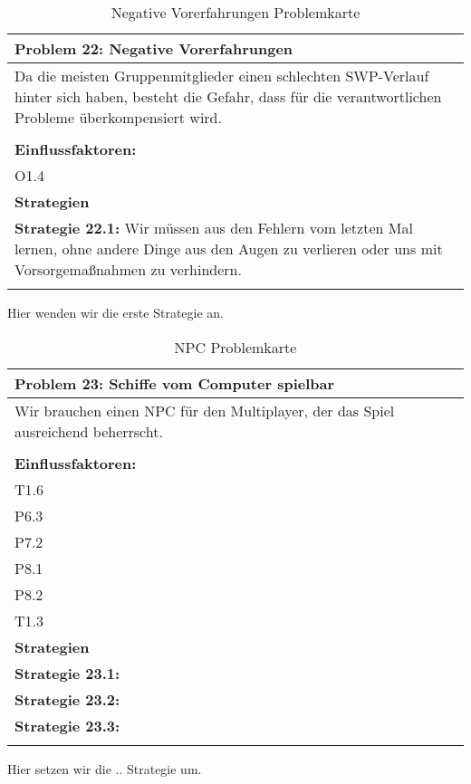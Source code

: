 \documentclass[fontsize=12pt,paper=a4,twoside]{scrartcl}
\begin{document}
\begin{table}[H]
    \centering
    \begin{tabular}{|p{15cm}|}
    \hline
          \textbf{Problem 22: Negative Vorerfahrungen}  \\ \hline
	Da die meisten Gruppenmitglieder einen schlechten SWP-Verlauf hinter sich haben, besteht die Gefahr, dass für die verantwortlichen Probleme überkompensiert wird. \\
         \\ \hline
          \textbf{Einflussfaktoren: } \\
	O1.4 \\
          \hline
          \textbf{Strategien} \\ \hline
            {}          
           \label{strategie:22.1}     
          \textbf{Strategie 22.1: } Wir müssen aus den Fehlern vom letzten Mal lernen, ohne andere Dinge aus den Augen zu verlieren oder uns mit Vorsorgemaßnahmen zu verhindern.  \\     
	 \\ \hline
    \end{tabular}

    \caption{Negative Vorerfahrungen Problemkarte}
    \label{tab:ProblemKarte22}
\end{table}
Hier wenden wir die erste Strategie an. \\

\begin{table}[H]
    \centering
    \begin{tabular}{|p{15cm}|}
    \hline
          \textbf{Problem 23: Schiffe vom Computer spielbar}  \\ \hline
	Wir brauchen einen NPC für den Multiplayer, der das Spiel ausreichend beherrscht. \\
         \\ \hline
          \textbf{Einflussfaktoren: } \\
	T1.6 \\
	P6.3 \\
	P7.2 \\
	P8.1 \\
	P8.2 \\
	T1.3 \\
          \hline
          \textbf{Strategien} \\ \hline
            {}          
           \label{strategie:23.1}     
          \textbf{Strategie 23.1:}  \\        
  {}          
           \label{strategie:23.2}              
          \textbf{Strategie 23.2:}  \\
	 {}          
           \label{strategie:23.3}     
          \textbf{Strategie 23.3: }  \\ 
	 \\ \hline
    \end{tabular}

    \caption{NPC Problemkarte}
    \label{tab:ProblemKarte23}
\end{table}
Hier setzen wir die .. Strategie um. \\
\end{document}
